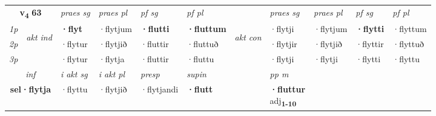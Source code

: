 \noindent
\begin{tabular}{lllllllllll} \toprule
\multicolumn{2}{c}{\textbf{v{\textsubscript{4}}} \Large{\textbf{63}}}  &  \textit{praes sg}  & \textit{praes pl}  &\textit{ pf sg} & \textit{pf pl} &  &  \textit{praes sg}  & \textit{praes pl}  & \textit{pf sg} & \textit{pf pl } \\*
	\cmidrule{3-6} \cmidrule{8-11}
 {\textit{1p}} & \multirow{3}{*}{\begin{turn}{90}\textit{akt ind}\end{turn}} & \textbf{·flyt} & ·flytjum & \textbf{·flutti} & \textbf{·fluttum} & \multirow{3}{*}{\begin{turn}{90}\textit{akt con}\end{turn}} &·flytji & ·flytjum & \textbf{·flytti} & ·flyttum\\*
 {\textit{2p}} &  &  ·flytur  & ·flytjið & ·fluttir & ·fluttuð & & ·flytjir & ·flytjið & ·flyttir & ·flyttuð \\*
{\textit{3p}} &  & ·flytur & ·flytja & ·fluttir & ·fluttu & & ·flytji & ·flytji& ·flytti & ·flyttu \\*
\cmidrule{3-6} \cmidrule{8-11}

   \multicolumn{2}{c}{\textit{inf}}  & \textit{i akt sg} & \textit{i akt pl}   & \textit{presp} & \textit{supin}  && \textit{pp m} \\*
  \multicolumn{2}{c}{\textbf{sel\allowbreak ·flytja}} & ·flyttu  & ·flytjið   & ·flytjandi &  \textbf{·flutt}  && \specialcell{\textbf{·fluttur} \\ adj\textbf{\textsubscript{1-10}}} \\*
\end{tabular}

